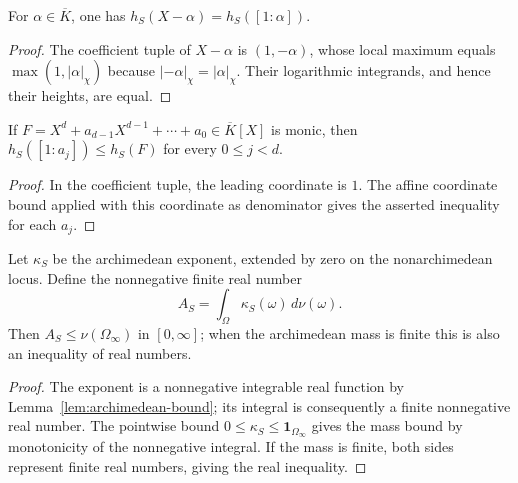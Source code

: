 \begin{lemma}
\label{lem:polynomial-height-linear}
\leanok
For $\alpha\in\overline K$, one has
$h_S(X-\alpha)=h_S([1:\alpha])$.
\end{lemma}
\begin{proof}
The coefficient tuple of $X-\alpha$ is $(1,-\alpha)$, whose local
maximum equals $\max(1,|\alpha|_\chi)$ because
$|-\alpha|_\chi=|\alpha|_\chi$. Their logarithmic integrands, and
hence their heights, are equal.
\end{proof}

\begin{lemma}
\label{lem:polynomial-height-monic-coefficient}
\leanok
If $F=X^d+a_{d-1}X^{d-1}+\cdots+a_0\in\overline K[X]$ is monic,
then $h_S([1:a_j])\leq h_S(F)$ for every $0\leq j<d$.
\end{lemma}
\begin{proof}
In the coefficient tuple, the leading coordinate is $1$. The affine
coordinate bound applied with this coordinate as denominator gives
the asserted inequality for each $a_j$.
\end{proof}

\begin{definition}
\label{def:height-archimedean-constant}
\leanok
Let $\kappa_S$ be the archimedean exponent, extended by zero on
the nonarchimedean locus. Define the nonnegative finite real number
\[
 A_S=\int_\Omega\kappa_S(\omega)\,d\nu(\omega).
\]
Then $A_S\leq\nu(\Omega_\infty)$ in $[0,\infty]$; when the
archimedean mass is finite this is also an inequality of real numbers.
\end{definition}
\begin{proof}
The exponent is a nonnegative integrable real function by
Lemma~\ref{lem:archimedean-bound}; its integral is consequently
a finite nonnegative real number. The pointwise bound
$0\leq\kappa_S\leq\mathbf1_{\Omega_\infty}$ gives the mass bound
by monotonicity of the nonnegative integral. If the mass is finite,
both sides represent finite real numbers, giving the real inequality.
\end{proof}

